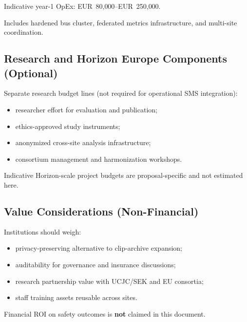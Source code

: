 Indicative year-1 OpEx: EUR~80{,}000--EUR~250{,}000.

Includes hardened bus cluster, federated metrics infrastructure, and multi-site coordination.

\subsection{Research and Horizon Europe Components (Optional)}

Separate research budget lines (not required for operational SMS integration):
\begin{itemize}[noitemsep]
  \item researcher effort for evaluation and publication;
  \item ethics-approved study instruments;
  \item anonymized cross-site analysis infrastructure;
  \item consortium management and harmonization workshops.
\end{itemize}

Indicative Horizon-scale project budgets are proposal-specific and not estimated here.

\subsection{Value Considerations (Non-Financial)}

Institutions should weigh:
\begin{itemize}[noitemsep]
  \item privacy-preserving alternative to clip-archive expansion;
  \item auditability for governance and insurance discussions;
  \item research partnership value with UCJC/SEK and EU consortia;
  \item staff training assets reusable across sites.
\end{itemize}

Financial ROI on safety outcomes is \textbf{not} claimed in this document.
